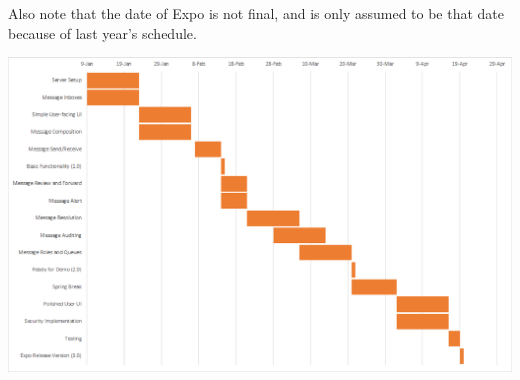\documentclass[onecolumn, draftclsnofoot,10pt, compsoc]{IEEEtran}
\begin{document}
Also note that the date of Expo is not final, and is only assumed to be that date because of last year's schedule.

\includegraphics[angle=-90,origin=c,width=\textwidth,height=\textheight,keepaspectratio]{gantt-chart.eps}
\end{document}
